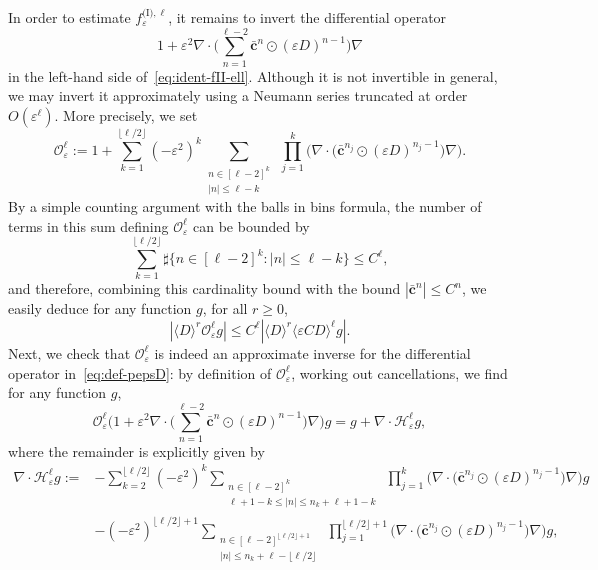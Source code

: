 \documentclass[10pt]{amsart}
\theoremstyle{plain}
\theoremstyle{definition}
\numberwithin{equation}{section}
\newcommand{\e}{\varepsilon}
\newcommand{\cc}{{\boldsymbol c}}
\begin{document}
In order to estimate $f_\e^{\text{(I)},\ell}$, it remains to invert the differential operator
\begin{equation}\label{eq:def-pepsD}
1+\e^2\nabla\cdot\Big(\sum_{n=1}^{\ell-2}\bar\cc^n\odot(\e D)^{n-1}\Big)\nabla
\end{equation}
in the left-hand side of~\eqref{eq:ident-fII-ell}.
Although it is not invertible in general, we may invert it approximately using {a Neumann series truncated at order $O(\e^{\ell})$. More precisely, we set
\begin{equation*}
\mathcal{O}^{\ell}_{\e}:=1+\sum_{k=1}^{\lfloor \ell/2\rfloor}(-\e^2)^k\sum_{\substack{n\in[\ell-2]^k\\ |n|\le\ell-k}}~\prod_{j=1}^{k}\Big(\nabla\cdot\big(\bar\cc^{n_j}\odot(\e D)^{n_j-1}\big)\nabla\Big). 
\end{equation*}
{By a simple counting argument with the balls in bins formula, the number of terms in this sum defining $\mathcal{O}^{\ell}_{\e}$ can be bounded by
\begin{equation*}
\sum_{k=1}^{\lfloor \ell/2\rfloor}\sharp\{n\in [\ell-2]^k:|n|\le\ell-k\}\le C^\ell,
\end{equation*}
and therefore,} combining this cardinality bound
with the bound $|\bar\cc^n|\leq C^n$, we easily deduce for any function $g$, for all $r\ge0$,
\begin{equation}\label{eq:boundapproxInv}
|\langle D\rangle^r \mathcal{O}^{\ell}_{\e}g|\leq C^{\ell}|\langle D\rangle^{r}\langle\e CD\rangle^{\ell}g|.
\end{equation}
{Next, we check that $\mathcal O_\e^\ell$ is indeed an approximate inverse for the differential operator in~\eqref{eq:def-pepsD}: by definition of $\mathcal O_\e^\ell$, working out cancellations, we find for any function $g$,
\begin{equation*}
\mathcal O_\e^\ell\bigg(1+\e^2\nabla\cdot\Big(\sum_{n=1}^{\ell-2}\bar\cc^n\odot(\e D)^{n-1}\Big)\nabla\bigg)g
=g+\nabla\cdot\mathcal H_\e^\ell g,
\end{equation*}
where the remainder is explicitly given by
\begin{align*}\nabla\cdot\mathcal H_\e^\ell g:=&-\sum_{k=2}^{\lfloor\ell/2\rfloor}(-\e^2)^k\sum_{\substack{n\in[\ell-2]^k\\\ell+1-k\le|n|\le n_k+\ell+1-k}}~\prod_{j=1}^k\Big(\nabla\cdot\big(\bar\cc^{n_j}\odot(\e D)^{n_j-1}\big)\nabla\Big)g\\&-(-\e^2)^{\lfloor\ell/2\rfloor+1}\sum_{\substack{n\in[\ell-2]^{\lfloor\ell/2\rfloor+1}\\ |n|\le n_k+\ell-\lfloor\ell/2\rfloor}}~\prod_{j=1}^{\lfloor\ell/2\rfloor+1}\Big(\nabla\cdot\big(\bar\cc^{n_j}\odot(\e D)^{n_j-1}\big)\nabla\Big)g,\end{align*}
}}
\end{document}
